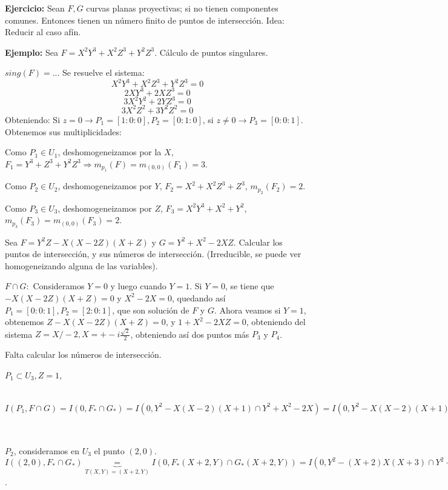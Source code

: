 \textbf{Ejercicio:} Sean $F,G$ curvas planas proyectivas; si no tienen componentes comunes. Entonces tienen un número finito de puntos de intersección. Idea: Reducir al caso afín. 


\textbf{Ejemplo:} Sea $F=X^2Y^3+X^2Z^3+Y^2Z^3$. Cálculo de puntos singulares. 

$sing(F)= ...$ Se resuelve el sistema:
$$ X^2Y^3+X^2Z^3+Y^2Z^3=0$$
$$ 2XY^3+2XZ^3=0$$
$$3X^2Y^2+2YZ^3=0$$
$$3X^2Z^2+3Y^2Z^2=0$$
Obteniendo: Si $z=0 \rightarrow P_1=[1:0:0],P_2=[0:1:0]$, si $z\neq 0 \rightarrow P_3=[0:0:1]$. 
Obtenemos sus multiplicidades:
\begin{itemize*}
\item Como $P_1\in U_1$, deshomogeneizamos por la $X$, $F_1=Y^3+Z^3+Y^2Z^3 \Rightarrow m_{p_1}(F)=m_{(0,0)}(F_1)=3$.
\item Como $P_2\in U_2$, deshomogeneizamos por $Y$, $F_2=X^2+X^2Z^3+Z^3$, $m_{p_2}(F_2)=2$.

\item Como $P_3\in U_3$, deshomogeneizamos por $Z$, $F_3=X^2Y^3+X^2+Y^2$, $m_{p_3}(F_3)=m_{(0,0)}(F_3)=2$.
\end{itemize*}

\vspace{5mm}


Sea $F=Y^2Z-X(X-2Z)(X+Z)$ y $G=Y^2+X^2-2XZ$. Calcular los puntos de intersección, y sus números de intersección.  (Irreducible, se puede ver homogeneizando alguna de las variables). 

$F\cap G:$ Consideramos $Y=0$ y luego cuando $Y=1$. Si $Y=0$, se tiene que $-X(X-2Z)(X+Z)=0$ y $X^2-2X=0$, quedando así $P_1=[0:0:1],P_2=[2:0:1]$, que son solución de $F$ y $G$. Ahora veamos si $Y=1$, obtenemos $Z-X(X-2Z)(X+Z)=0$, y $1+X^2-2XZ=0$, obteniendo del sistema $Z=X/-2, X=+-i\frac{\sqrt{2}}{2}$, obteniendo así dos puntos más $P_3$ y $P_4$. 

Falta calcular los números de intersección. 


$P_1\subset U_3, Z=1$, $I(P_1,F\cap G)=I(0,F_*\cap G_*)=I(0,Y^2-X(X-2)(X+1)\cap Y^2+X^2-2X)= I(0, Y^2-X(X-2)(X+1)\cap Y^2+X(X-2)) = I(0,F_*+(X+1)G_*\cap G_*)=I(0, \underbrace{Y^2+(X+1)Y^2}_{Y^2\underbrace{(X+2)}_{unidad,O_p(\mathbb{A})=Y^2}}\cap Y^2+X(X-2))=I(0,Y^2\cap Y^2+X(X-2))=I(0,Y^2\cap X(X-2))=2$ 


$P_2$, consideramos en $U_3$ el punto $(2,0)$. $I((2,0),F_*\cap G_*)\underbrace{=}_{T(X,Y)=(X+2,Y)}I(0,F_*(X+2,Y)\cap G_*(X+2,Y))=I(0,Y^2-(X+2)X(X+3)\cap Y^2+X(X+2))= I(0,H_1\cap H_2)=I(0,H_1+(X+3)H_2\cap H_2)=I(0,Y^2(X+4) \cap H_2-Y^2)=I(0,Y^2\cap X(X+2))=I(0,Y^2\cap X)=2$.


